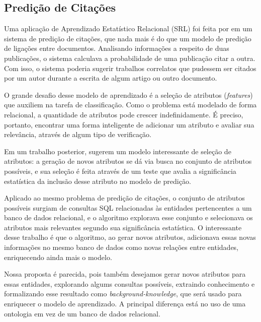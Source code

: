 \subsection{Predição de Citações}
\label{ssec:srl}

Uma aplicação de Aprendizado Estatístico Relacional (SRL) foi feita por \citet{Popescul2003} em um sistema de predição de citações, que nada mais é do que um modelo de predição de ligações entre documentos. Analisando informações a respeito de duas publicações, o sistema calculava a probabilidade de uma publicação citar a outra. Com isso, o sistema poderia sugerir trabalhos correlatos que pudessem ser citados por um autor durante a escrita de algum artigo ou outro documento.

O grande desafio desse modelo de aprendizado é a seleção de atributos (\textit{features}) que auxiliem na tarefa de classificação. Como o problema está modelado de forma relacional, a quantidade de atributos pode crescer indefinidamente. É preciso, portanto, encontrar uma forma inteligente de adicionar um atributo e avaliar sua relevância, através de algum tipo de verificação.

Em um trabalho posterior, \citet{Popescul2007} sugerem um modelo interessante de seleção de atributos: a geração de novos atributos se dá via busca no conjunto de atributos possíveis, e sua seleção é feita através de um teste que avalia a significância estatística da inclusão desse atributo no modelo de predição.

Aplicado ao mesmo problema de predição de citações, o conjunto de atributos possíveis surgiam de consultas SQL relacionadas às entidades pertencentes a um banco de dados relacional, e o algoritmo explorava esse conjunto e selecionava os atributos mais relevantes segundo sua significância estatística. O interessante desse trabalho é que o algoritmo, ao gerar novos atributos, adicionava essas novas informações no mesmo banco de dados como novas relações entre entidades, enriquecendo ainda mais o modelo.

Nossa proposta é parecida, pois também desejamos gerar novos atributos para essas entidades, explorando algums consultas possíveis, extraindo conhecimento e formalizando esse resultado como \textit{background-knowledge}, que será usado para enriquecer o modelo de aprendizado.  A principal diferença está no uso de uma ontologia em vez de um banco de dados relacional.


